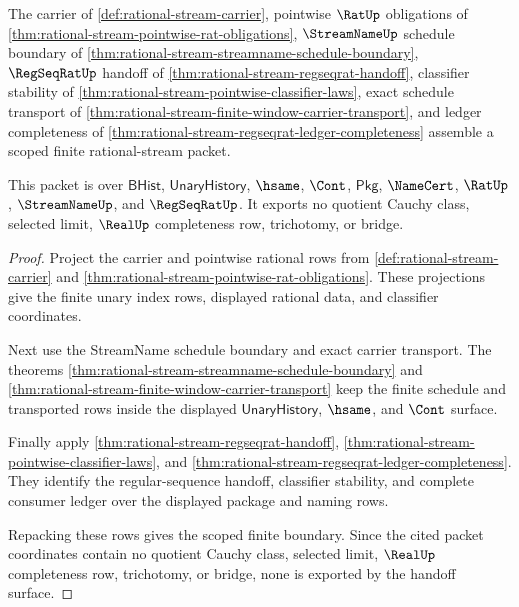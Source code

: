 \begin{theorem}
\label{thm:rational-stream-scoped-boundary}
The carrier of \autoref{def:rational-stream-carrier}, pointwise $\RatUp$
obligations of \autoref{thm:rational-stream-pointwise-rat-obligations},
$\StreamNameUp$ schedule boundary of
\autoref{thm:rational-stream-streamname-schedule-boundary}, $\RegSeqRatUp$
handoff of \autoref{thm:rational-stream-regseqrat-handoff}, classifier
stability of \autoref{thm:rational-stream-pointwise-classifier-laws}, exact
schedule transport of
\autoref{thm:rational-stream-finite-window-carrier-transport}, and ledger
completeness of \autoref{thm:rational-stream-regseqrat-ledger-completeness}
assemble a scoped finite rational-stream packet.

This packet is over $\mathsf{BHist}$, $\mathsf{UnaryHistory}$, $\hsame$,
$\Cont$, $\mathsf{Pkg}$, $\NameCert$, $\RatUp$, $\StreamNameUp$, and
$\RegSeqRatUp$. It exports no quotient Cauchy class, selected limit, $\RealUp$
completeness row, trichotomy, or bridge.
\end{theorem}
\begin{proof}
Project the carrier and pointwise rational rows from
\autoref{def:rational-stream-carrier} and
\autoref{thm:rational-stream-pointwise-rat-obligations}. These projections give
the finite unary index rows, displayed rational data, and classifier coordinates.

Next use the StreamName schedule boundary and exact carrier transport. The
theorems \autoref{thm:rational-stream-streamname-schedule-boundary} and
\autoref{thm:rational-stream-finite-window-carrier-transport} keep the finite
schedule and transported rows inside the displayed $\mathsf{UnaryHistory}$,
$\hsame$, and $\Cont$ surface.

Finally apply \autoref{thm:rational-stream-regseqrat-handoff},
\autoref{thm:rational-stream-pointwise-classifier-laws}, and
\autoref{thm:rational-stream-regseqrat-ledger-completeness}. They identify the
regular-sequence handoff, classifier stability, and complete consumer ledger
over the displayed package and naming rows.

Repacking these rows gives the scoped finite boundary. Since the cited packet
coordinates contain no quotient Cauchy class, selected limit, $\RealUp$
completeness row, trichotomy, or bridge, none is exported by the handoff surface.
\end{proof}

